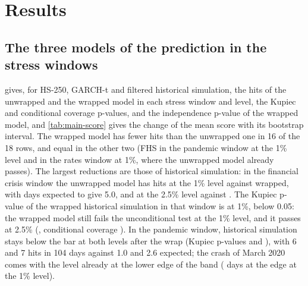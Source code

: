\section{Results}
\label{sec:results}

\subsection{The three models of the prediction in the stress windows}
\label{sec:results-main}

 gives, for HS-250, GARCH-t and filtered historical simulation, the hits of the unwrapped and the wrapped model in each stress window and level, the Kupiec and conditional coverage p-values, and the independence p-value of the wrapped model, and \cref{tab:main-score} gives the change of the mean score with its bootstrap interval. The wrapped model has fewer hits than the unwrapped one in 16 of the 18 rows, and equal in the other two (FHS in the pandemic window at the 1\% level and in the rates window at 1\%, where the unwrapped model already passes). The largest reductions are those of historical simulation: in the financial crisis window the unwrapped model has \hitUHsTwoFiftyOneEqCrisis{} hits at the 1\% level against \hitWHsTwoFiftyOneEqCrisis{} wrapped, with \nDaysEqCrisis{} days expected to give 5.0, and at the 2.5\% level \hitUHsTwoFiftyTwoHalfEqCrisis{} against \hitWHsTwoFiftyTwoHalfEqCrisis{}. The Kupiec p-value of the wrapped historical simulation in that window is \kupWHsTwoFiftyOneEqCrisis{} at 1\%, below 0.05: the wrapped model still fails the unconditional test at the 1\% level, and it passes at 2.5\% (\kupWHsTwoFiftyTwoHalfEqCrisis{}, conditional coverage \ccWHsTwoFiftyTwoHalfEqCrisis{}). In the pandemic window, historical simulation stays below the bar at both levels after the wrap (Kupiec p-values \kupWHsTwoFiftyOneEqCovid{} and \kupWHsTwoFiftyTwoHalfEqCovid{}), with 6 and 7 hits in 104 days against 1.0 and 2.6 expected; the crash of March 2020 comes with the level already at the lower edge of the band (\clipHsTwoFiftyOneEqCovid{} days at the edge at the 1\% level).




